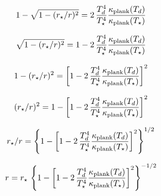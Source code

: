 \documentclass[11pt]{article}
\begin{document}
$$
1-\sqrt{1-(r_{\star}/r)^2} = 2\,\frac{T_d^4}{T_\star^4}\frac{\kappa_{\rm plank}(T_d)}{\kappa_{\rm plank}(T_\star)}
$$

$$
\sqrt{1-(r_{\star}/r)^2} = 1-2\,\frac{T_d^4}{T_\star^4}\frac{\kappa_{\rm plank}(T_d)}{\kappa_{\rm plank}(T_\star)}
$$

$$
1-(r_{\star}/r)^2 = \left[1-2\,\frac{T_d^4}{T_\star^4}\frac{\kappa_{\rm plank}(T_d)}{\kappa_{\rm plank}(T_\star)}\right]^2
$$

$$
(r_{\star}/r)^2 = 1-\left[1-2\,\frac{T_d^4}{T_\star^4}\frac{\kappa_{\rm plank}(T_d)}{\kappa_{\rm plank}(T_\star)}\right]^2
$$

$$
r_{\star}/r = \left\{1-\left[1-2\,\frac{T_d^4}{T_\star^4}\frac{\kappa_{\rm plank}(T_d)}{\kappa_{\rm plank}(T_\star)}\right]^2\right\} ^ {1/2}
$$

$$
r = r_{\star} \,  \left\{1-\left[1-2\,\frac{T_d^4}{T_\star^4}\frac{\kappa_{\rm plank}(T_d)}{\kappa_{\rm plank}(T_\star)}\right]^2\right\} ^ {-1/2}
$$
\end{document}
